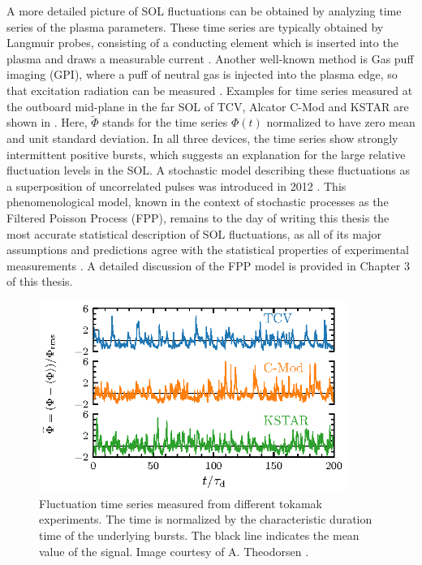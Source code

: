 A more detailed picture of SOL fluctuations can be obtained by analyzing time series of the plasma parameters. These time series are typically obtained by Langmuir probes, consisting of a conducting element which is inserted into the plasma and draws a measurable current \cite{langmuir1923positive,mott1926theory}. Another well-known method is Gas puff imaging (GPI), where a puff of neutral gas is injected into the plasma edge, so that excitation radiation can be measured \cite{zweben2017invited}. Examples for time series measured at the outboard mid-plane in the far SOL of TCV, Alcator C-Mod and KSTAR are shown in . Here, $\widetilde{\Phi}$ stands for the time series $\Phi(t)$ normalized to have zero mean and unit standard deviation. In all three devices, the time series show strongly intermittent positive bursts, which suggests an explanation for the large relative fluctuation levels in the SOL. A stochastic model describing these fluctuations as a superposition of uncorrelated pulses was introduced in 2012 \cite{garcia2012stochastic}. This phenomenological model, known in the context of stochastic processes as the Filtered Poisson Process (FPP), remains to the day of writing this thesis the most accurate statistical description of SOL fluctuations, as all of its major assumptions and predictions agree with the statistical properties of experimental measurements \cite{garcia2013intermittent,garcia2013burst,garcia2015intermittent,kube2016fluctuation,garcia2017sol,kube2018intermittent,garcia2018intermittent,theodorsen2018universality}. A detailed discussion of the FPP model is provided in Chapter 3 of this thesis.
\begin{figure}[t]
	\centering
	\includegraphics[width=10cm]{figures/compare_ts_alt.eps}
	\caption{Fluctuation time series measured from different tokamak experiments. The time is normalized by the characteristic duration time of the underlying bursts. The black line indicates the mean value of the signal. Image courtesy of A. Theodorsen \cite{theodorsen2018statistical}.}
	\label{Fig:time_series}
\end{figure}

